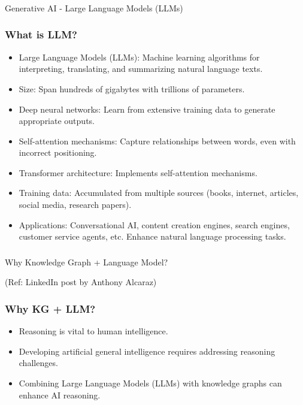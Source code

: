 \begin{frame}[fragile]\frametitle{}
\begin{center}
{\Large Generative AI - Large Language Models (LLMs)}

\end{center}
\end{frame}


\begin{frame}[fragile]\frametitle{What is LLM?}

\begin{itemize}
\item Large Language Models (LLMs): Machine learning algorithms for interpreting, translating, and summarizing natural language texts.
\item Size: Span hundreds of gigabytes with trillions of parameters.
\item Deep neural networks: Learn from extensive training data to generate appropriate outputs.
\item Self-attention mechanisms: Capture relationships between words, even with incorrect positioning.
\item Transformer architecture: Implements self-attention mechanisms.
\item Training data: Accumulated from multiple sources (books, internet, articles, social media, research papers).
\item Applications: Conversational AI, content creation engines, search engines, customer service agents, etc.
Enhance natural language processing tasks.
\end{itemize}

\end{frame}

\begin{frame}[fragile]\frametitle{}
\begin{center}
{\Large Why Knowledge Graph + Language Model?}

{\tiny (Ref: LinkedIn post by Anthony Alcaraz)}
\end{center}
\end{frame}


\begin{frame}[fragile]\frametitle{Why KG + LLM?}
    \begin{itemize}
        \item Reasoning is vital to human intelligence.
        \item Developing artificial general intelligence requires addressing reasoning challenges.
        \item Combining Large Language Models (LLMs) with knowledge graphs can enhance AI reasoning.
    \end{itemize}
\end{frame}

